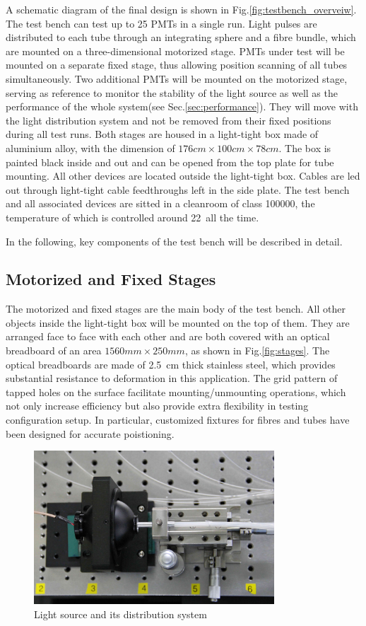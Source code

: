 \documentclass[5p, times]{elsarticle}
\begin{document}
A schematic diagram of the final design is shown in Fig.\ref{fig:testbench_overveiw}.
The test bench can test up to 25 PMTs in a single run.
Light pulses are distributed to each tube through an integrating sphere and a fibre bundle, which are mounted on a three-dimensional motorized stage.
PMTs under test will be mounted on a separate fixed stage, thus allowing position scanning of all tubes simultaneously.
Two additional PMTs will be mounted on the motorized stage, serving as reference to monitor the stability of the light source as well as the performance of the whole system(see Sec.\ref{sec:performance}).
They will move with the light distribution system and not be removed from their fixed positions during all test runs. 
Both stages are housed in a light-tight box made of aluminium alloy, with the dimension of $176cm\times100cm\times78cm$.
The box is painted black inside and out and can be opened from the top plate for tube mounting.
All other devices are located outside the light-tight box.
Cables are led out through light-tight cable feedthroughs left in the side plate.
The test bench and all associated devices are sitted in a cleanroom of class 100000, the temperature of which is controlled around 22\textcelsius~all the time.

In the following, key components of the test bench will be described in detail.
\subsection{Motorized and Fixed Stages}
\label{sec:stages}

The motorized and fixed stages are the main body of the test bench.
All other objects inside the light-tight box will be mounted on the top of them.
They are arranged face to face with each other and are both covered with an optical breadboard of an area $1560mm\times250mm$, as shown in Fig.\ref{fig:stages}.
The optical breadboards are made of \SI{2.5}{cm} thick stainless steel, which provides substantial resistance to deformation in this application.
The grid pattern of tapped holes on the surface facilitate mounting/unmounting operations, which not only increase efficiency but also provide extra flexibility in testing configuration setup.
In particular, customized fixtures for fibres and tubes have been designed for accurate poistioning.



\begin{figure}
 \centering
 \includegraphics[width=90mm]{light_source1_crop}
\caption{Light source and its distribution system}
\label{fig:light_source}
\end{figure} 
\end{document}
